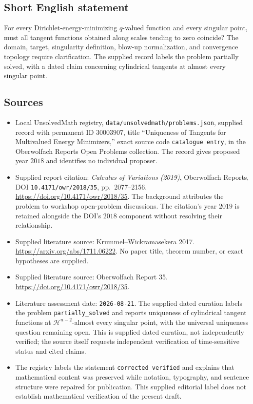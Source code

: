 \documentclass[11pt]{article}
\begin{document}
\subsection{Short English statement}
For every Dirichlet-energy-minimizing \(q\)-valued function and every singular point, must all tangent functions obtained along scales tending to zero coincide? The domain, target, singularity definition, blow-up normalization, and convergence topology require clarification. The supplied record labels the problem partially solved, with a dated claim concerning cylindrical tangents at almost every singular point.
\subsection{Sources}
\begin{itemize}
\item Local UnsolvedMath registry, \texttt{data/unsolvedmath/problems.json}, supplied record with permanent ID \(30003907\), title ``Uniqueness of Tangents for Multivalued Energy Minimizers,'' exact source code \texttt{catalogue entry}, in the Oberwolfach Reports Open Problems collection. The record gives proposed year \(2018\) and identifies no individual proposer.
\item Supplied report citation: \emph{Calculus of Variations (2019)}, Oberwolfach Reports, DOI \texttt{10.4171/owr/2018/35}, pp.\ 2077--2156. \url{https://doi.org/10.4171/owr/2018/35}. The background attributes the problem to workshop open-problem discussions. The citation's year \(2019\) is retained alongside the DOI's \(2018\) component without resolving their relationship.
\item Supplied literature source: Krummel--Wickramasekera 2017. \url{https://arxiv.org/abs/1711.06222}. No paper title, theorem number, or exact hypotheses are supplied.
\item Supplied literature source: Oberwolfach Report 35. \url{https://doi.org/10.4171/owr/2018/35}.
\item Literature assessment date: \texttt{2026-08-21}. The supplied dated curation labels the problem \texttt{partially\_solved} and reports uniqueness of cylindrical tangent functions at \(\mathcal H^{n-2}\)-almost every singular point, with the universal uniqueness question remaining open. This is supplied dated curation, not independently verified; the source itself requests independent verification of time-sensitive status and cited claims.
\item The registry labels the statement \texttt{corrected\_verified} and explains that mathematical content was preserved while notation, typography, and sentence structure were repaired for publication. This supplied editorial label does not establish mathematical verification of the present draft.
\end{itemize}
\end{document}
